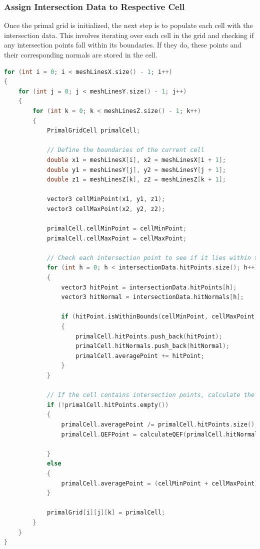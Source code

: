 \subsubsection{Assign Intersection Data to Respective Cell}

Once the primal grid is initialized, the next step is to populate each cell with the intersection data. This involves iterating over each cell in the grid and checking if any intersection points fall within its boundaries. If they do, these points and their corresponding normals are stored in the cell.

\begin{lstlisting}[language=C++, caption=Assigning intersection data to the primal grid cells, label=lst:sort-intersection-data]
for (int i = 0; i < meshLinesX.size() - 1; i++)
{
    for (int j = 0; j < meshLinesY.size() - 1; j++)
    {
        for (int k = 0; k < meshLinesZ.size() - 1; k++)
        {
            PrimalGridCell primalCell;

            // Define the boundaries of the current cell
            double x1 = meshLinesX[i], x2 = meshLinesX[i + 1];
            double y1 = meshLinesY[j], y2 = meshLinesY[j + 1];
            double z1 = meshLinesZ[k], z2 = meshLinesZ[k + 1];

            vector3 cellMinPoint(x1, y1, z1);
            vector3 cellMaxPoint(x2, y2, z2);

            primalCell.cellMinPoint = cellMinPoint;
            primalCell.cellMaxPoint = cellMaxPoint;

            // Check each intersection point to see if it lies within the current cell
            for (int h = 0; h < intersectionData.hitPoints.size(); h++)
            {
                vector3 hitPoint = intersectionData.hitPoints[h];
                vector3 hitNormal = intersectionData.hitNormals[h];

                if (hitPoint.isWithinBounds(cellMinPoint, cellMaxPoint, tol))
                {
                    primalCell.hitPoints.push_back(hitPoint);
                    primalCell.hitNormals.push_back(hitNormal);
                    primalCell.averagePoint += hitPoint;
                }
            }

            // If the cell contains intersection points, calculate the average and QEF point
            if (!primalCell.hitPoints.empty())
            {
                primalCell.averagePoint /= primalCell.hitPoints.size();
                primalCell.QEFPoint = calculateQEF(primalCell.hitNormals, primalCell.hitPoints, primalCell.averagePoint, primalCell.cellMinPoint, primalCell.cellMaxPoint);

            }
            else
            {
                primalCell.averagePoint = (cellMinPoint + cellMaxPoint) / 2;
            }

            primalGrid[i][j][k] = primalCell;
        }
    }
}
\end{lstlisting}

